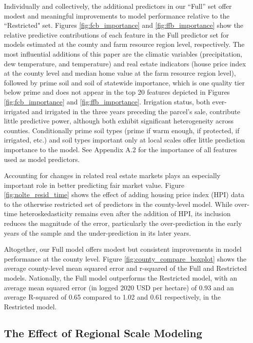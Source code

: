 \documentclass[12pt]{article}
\begin{document}
Individually and collectively, the additional predictors in our ``Full'' set offer modest and meaningful improvements to model performance relative to the ``Restricted" set. Figures \ref{fig:fcb_importance} and \ref{fig:ffb_importance} show the relative predictive contributions of each feature in the Full predictor set for models estimated at the county and farm resource region level, respectively. The most influential additions of this paper are the climatic variables (precipitation, dew temperature, and temperature) and real estate indicators (house price index at the county level and median home value at the farm resource region level), followed by prime soil and soil of statewide importance, which is one quality tier below prime and does not appear in the top 20 features depicted in Figures \ref{fig:fcb_importance} and \ref{fig:ffb_importance}. Irrigation status, both ever-irrigated and irrigated in the three years preceding the parcel's sale, contribute little predictive power, although both exhibit significant heterogeneity across counties. Conditionally prime soil types (prime if warm enough, if protected, if irrigated, etc.) and soil types important only at local scales offer little prediction importance to the model. See Appendix A.2 for the importance of all features used as model predictors.

Accounting for changes in related real estate markets plays an especially important role in better predicting fair market value. Figure \ref{fig:nolte_resid_time} shows the effect of adding housing price index (HPI) data to the otherwise restricted set of predictors in the county-level model. While over-time heteroskedasticity remains even after the addition of HPI, its inclusion reduces the magnitude of the error, particularly the over-prediction in the early years of the sample and the under-prediction in its later years.

Altogether, our Full model offers modest but consistent improvements in model performance at the county level. Figure \ref{fig:county_compare_boxplot} shows the average county-level mean squared error and r-squared of the Full and Restricted models. Nationally, the Full model outperforms the Restricted model, with an average mean squared error (in logged 2020 USD per hectare) of 0.93 and an average R-squared of 0.65 compared to 1.02 and 0.61 respectively, in the Restricted model.

\subsection{The Effect of Regional Scale Modeling}
\end{document}
